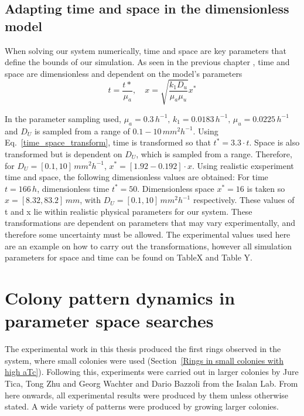 \subsection{Adapting time and space in the dimensionless model}
When solving our system numerically, time and space are key parameters that define the bounds of our simulation.
As seen in the previous chapter , time and space are dimensionless and dependent on the model’s parameters
\begin{equation}\label{time_space_transform}
    t = \frac{t*}{\mu _a}, \quad x = \sqrt{\frac{k_{1}D_{u}}{\mu_{a}\mu_{u}}}x^*
\end{equation}

In the parameter sampling used, $\mu_a = 0.3 \,h^{-1}, \,k_1 = 0.0183 \,h^{-1},\, \mu_u = 0.0225\, h^{-1}$ and $D_U$ is sampled from a range of $0.1-10 \,mm^2h^{-1}$.
Using Eq.~\ref{time_space_transform}, time is transformed so that $t^*=3.3\cdot t$.
Space is also transformed but is dependent on $D_U$, which is sampled from a range.
Therefore, for $D_U = [0.1, 10] \,mm^2 h^{-1}$, $x^* =[1.92 - 0.192] \cdot x$.
Using realistic exsperiment time and space, the following dimensionless values are obtained:
For time $t=166\,h$, dimensionless time $t^*=50$.
Dimensionless space  $x^*=16$ is taken so  $x = [8.32, 83.2] \,mm$, with $D_U = [0.1, 10]\, mm^2 h^{-1}$ respectively.
These values of t and x lie within realistic physical parameters for our system.
These transformations are dependent on parameters that may vary experimentally, and therefore some uncertainty must be allowed.
The experimental values used here are an example on how to carry out the transformations, however all simulation parameters for space and time can be found on TableX and Table Y.
\section{Colony pattern dynamics in parameter space searches}

The experimental work in this thesis produced the first rings observed in the system, where small colonies were used (Section~\ref{Rings in small colonies with high aTc}).
Following this, experiments were carried out in larger colonies by Jure Tica, Tong Zhu and Georg Wachter and Dario Bazzoli from the Isalan Lab.
From here onwards, all experimental results were produced by them unless otherwise stated.
A wide variety of patterns were produced by growing larger colonies.


